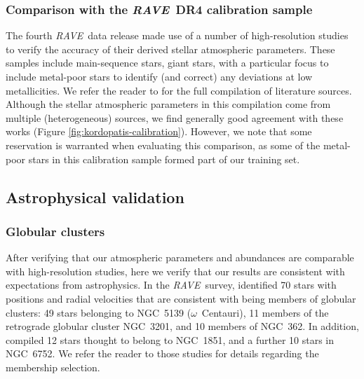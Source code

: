 \documentclass[preprint]{aastex}
\newcommand{\acronym}[1]{{\small{#1}}}
\newcommand{\project}[1]{\textsl{#1}}
\newcommand{\rave}{\project{\acronym{RAVE}}}
\begin{document}
\subsubsection{Comparison with the \rave\ DR4 calibration sample}
\label{sec:dr4-calibration-sample}


The fourth \rave\ data release made use of a number of high-resolution studies
to verify the accuracy of their derived stellar atmospheric parameters.  These
samples include main-sequence stars, giant stars, with a particular focus to
include metal-poor stars to identify (and correct) any deviations at low
metallicities.  We refer the reader to \citet{Kordopatis_2013} for the full 
compilation of literature sources.  Although the stellar atmospheric parameters
in this compilation come from multiple (heterogeneous) sources, we find 
generally good agreement with these works 
(Figure \ref{fig:kordopatis-calibration}).  However, we note that some 
reservation is warranted when evaluating this comparison, as some of the 
metal-poor stars in this calibration sample formed part of our training set.  


\subsection{Astrophysical validation}
\label{sec:astrophysical-validation}

\subsubsection{Globular clusters}
\label{sec:globular-cluster-validation}


After verifying that our atmospheric parameters and abundances are comparable 
with high-resolution studies, here we verify that our results are consistent
with expectations from astrophysics.  In the \rave\ survey, \cite{Anguiano_2015}
identified 70 stars with positions and radial velocities that are consistent 
with being members of globular clusters: 49 stars belonging to NGC~5139
($\omega$~Centauri), 11 members of the retrograde globular cluster NGC~3201, and 10 
members of NGC~362. In addition, \citet{Kunder_2014} compiled 12 stars thought to 
belong to NGC~1851, and a further 10 stars in NGC~6752.  We refer the reader to 
those studies for details regarding the membership selection.
\end{document}
